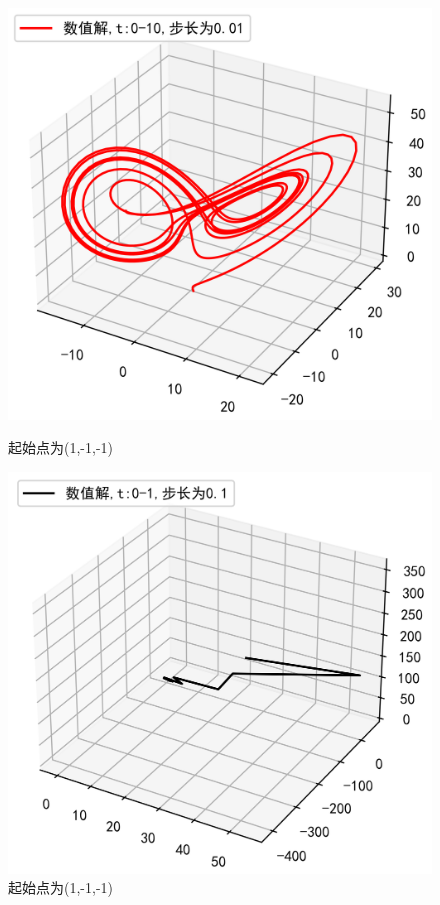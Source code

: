 \documentclass[a4paper]{article}%
\begin{document}
\begin{figure}[h]
    \begin{minipage}[h]{0.48\linewidth}
    \centering
    \includegraphics[scale=0.65]{73}
    \caption{起始点为(1,-1,-1)}
    \end{minipage}
    \begin{minipage}[h]{0.48\linewidth}
    \centering
    \includegraphics[scale=0.65]{74}
    \caption{起始点为(1,-1,-1)}
    \end{minipage}
\end{figure}
\end{document}

